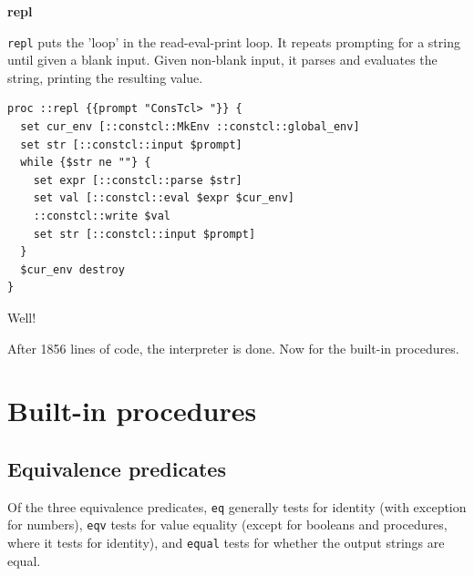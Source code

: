 \documentclass[twoside,9pt]{report}
\begin{document}
\textbf{repl}


\texttt{repl} puts the 'loop' in the read-eval-print loop. It repeats prompting for a string until given a blank input. Given non-blank input, it parses and evaluates the string, printing the resulting value.

\begin{lstlisting}
proc ::repl {{prompt "ConsTcl> "}} {
  set cur_env [::constcl::MkEnv ::constcl::global_env]
  set str [::constcl::input $prompt]
  while {$str ne ""} {
    set expr [::constcl::parse $str]
    set val [::constcl::eval $expr $cur_env]
    ::constcl::write $val
    set str [::constcl::input $prompt]
  }
  $cur_env destroy
}
\end{lstlisting}


Well!


After 1856 lines of code, the interpreter is done. Now for the built-in procedures.

\chapter{Built-in procedures}
\label{built-in-procedures}
\section{Equivalence predicates}
\label{equivalence-predicates}


Of the three equivalence predicates, \texttt{eq} generally tests for identity (with exception for numbers), \texttt{eqv} tests for value equality (except for booleans and procedures, where it tests for identity), and \texttt{equal} tests for whether the output strings are equal.
\end{document}
